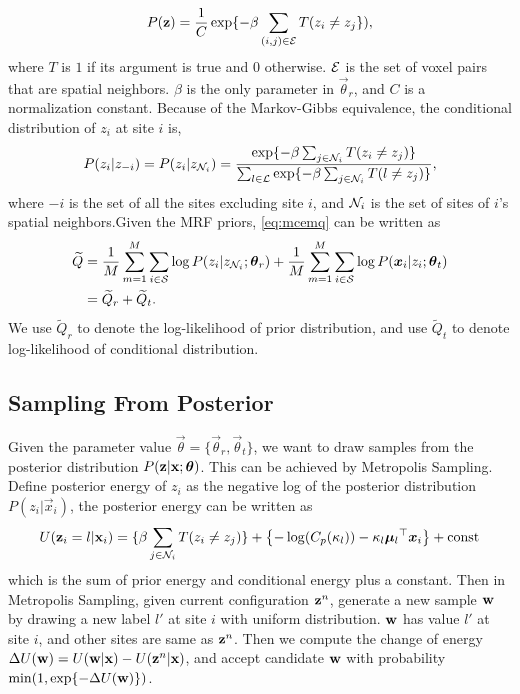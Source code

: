 \documentclass[runningheads,a4paper]{llncs}
\begin{document}
\begin{equation*}
  P(\text{\bf z}) = \frac{1}{C}\exp \{ -\beta \sum_{(i,j) \in \mathcal{E}}T(z_i \neq z_j\}),
\end{equation*}
where $T$ is $1$ if its argument is true and $0$ otherwise. $\mathcal{E}$ is
the set of voxel pairs that are spatial neighbors. $\beta$ is the only
parameter in $\vec \theta_r$, and $C$ is a normalization
constant. Because of the Markov-Gibbs equivalence, the conditional
distribution of $z_i$ at site $i$ is,
\begin{equation*}
  P(z_i | z_{-i}) = P(z_i | z_{\mathcal{N}_i}) = \frac{\exp \{ -\beta \sum_{j \in \mathcal{N}_i}T(z_i \neq z_j) \}}{\sum_{l \in \mathcal{L}} \exp \{ -\beta \sum_{j \in \mathcal{N}_i}T(l \neq z_j)\}},
\end{equation*}
where $-i$ is the set of all the sites excluding site $i$, and $\mathcal{N}_{i}$ is the
set of sites of $i$'s spatial neighbors.Given the MRF priors,
\eqref{eq:mcemq} can be written as
\begin{align*}
  \widetilde Q &= \frac{1}{M}\sum_{m=1}^{M} \sum_{i \in \cS} \log P(z_i | z_{\cN_i}; \vec \theta_r) + \frac{1}{M}\sum_{m=1}^{M}\sum_{i \in \cS} \log P(\vec x_i | z_i; \vec \theta_t) \\
  &= \widetilde Q_r + \widetilde Q_t. \\
\end{align*}
We use $\widetilde Q_r$ to denote the log-likelihood of prior
distribution, and use $\widetilde Q_t$ to denote log-likelihood of
conditional distribution.

\subsection{Sampling From Posterior}
Given the parameter value $\vec \theta = \{\vec \theta_r, \vec
\theta_t \}$, we want to draw samples from the posterior distribution
$P(\mat z | \mat x; \vec \theta)$. This can be achieved by Metropolis
Sampling. Define posterior energy of $z_i$ as the negative log of the
posterior distribution $P(z_i | \vec x_i)$, the posterior energy can be
written as
\begin{equation*}
U(\mat z_i = l| \mat x_i) = \{\beta \sum_{j \in \cN_i} T(z_i \neq z_j)  \}  + \left \{ -\log(C_p(\kappa_l)) - \kappa_l \vec \mu_l \T \vec x_i \right \} + \mathrm{const}
\end{equation*}
which is the sum of prior energy and conditional energy plus a constant. Then in Metropolis Sampling, given current configuration $\text{\bf z}^n$, generate a new sample $\text{\bf w}$ by drawing a new label $l'$ at site $i$ with uniform distribution. $\text{\bf w}$ has value $l'$ at site $i$, and other sites are same as $\text{\bf z}^n$. Then we compute the change of energy $\Delta U(\text{\bf w}) = U(\text{\bf w} | \text{\bf x}) - U( \text{\bf z}^n | \text{\bf x})$, and accept candidate $\text{\bf w}$ with probability $\min (1, \exp \{ -\Delta U(\text{\bf w}) \})$.
\end{document}
